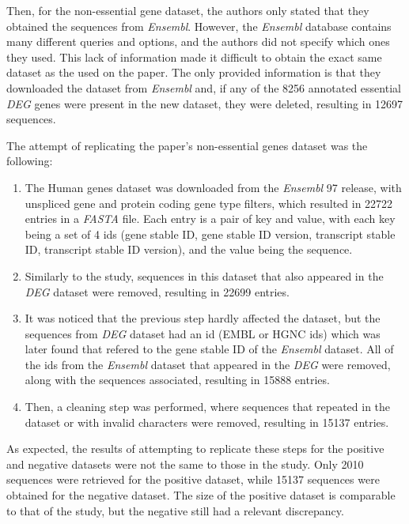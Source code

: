 Then, for the non-essential gene dataset, the authors only stated that they obtained the sequences from \textit{Ensembl}. However, the \textit{Ensembl} database contains many different queries and options, and the authors did not specify which ones they used. This lack of information made it difficult to obtain the exact same dataset as the used on the paper. The only provided information is that they downloaded the dataset from \textit{Ensembl} and, if any of the 8256 annotated essential \textit{DEG} genes were present in the new dataset, they were deleted, resulting in 12697 sequences.

The attempt of replicating the paper's non-essential genes dataset was the following:

\begin{enumerate}
    \item The Human genes dataset was downloaded from the \textit{Ensembl} 97 release, with unspliced gene and protein coding gene type filters, which resulted in 22722 entries in a \textit{FASTA} file. Each entry is a pair of key and value, with each key being a set of 4 ids (gene stable ID, gene stable ID version, transcript stable ID, transcript stable ID version), and the value being the sequence.
    \item Similarly to the study, sequences in this dataset that also appeared in the \textit{DEG} dataset were removed, resulting in 22699 entries.
    \item It was noticed that the previous step hardly affected the dataset, but the sequences from \textit{DEG} dataset had an id (EMBL or HGNC ids) which was later found that refered to the gene stable ID of the \textit{Ensembl} dataset. All of the ids from the \textit{Ensembl} dataset that appeared in the \textit{DEG} were removed, along with the sequences associated, resulting in 15888 entries.
    \item Then, a cleaning step was performed, where sequences that repeated in the dataset or with invalid characters were removed, resulting in 15137 entries.
\end{enumerate}

As expected, the results of attempting to replicate these steps for the positive and negative datasets were not the same to those in the study. Only 2010 sequences were retrieved for the positive dataset, while 15137 sequences were obtained for the negative dataset. The size of the positive dataset is comparable to that of the study, but the negative still had a relevant discrepancy. 

